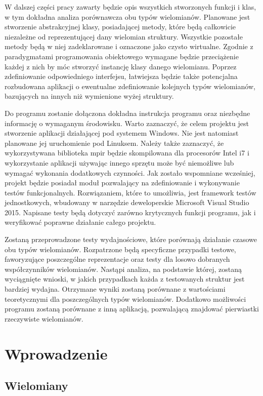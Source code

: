 \documentclass[twoside,a4paper]{book}
\begin{document}
W dalszej części pracy zawarty będzie opis wszystkich stworzonych funkcji i klas, w tym dokładna analiza porównawcza obu typów wielomianów. Planowane jest stworzenie abstrakcyjnej klasy, posiadającej metody, które będą całkowicie niezależne od reprezentującej dany wielomian struktury. Wszystkie pozostałe metody będą w niej zadeklarowane i oznaczone jako czysto wirtualne. Zgodnie z paradygmatami programowania obiektowego wymagane będzie przeciążenie każdej z nich by móc stworzyć instancję klasy danego wielomianu. Poprzez zdefiniowanie odpowiedniego interfejsu, łatwiejsza będzie także potencjalna rozbudowana aplikacji o ewentualne zdefiniowanie kolejnych typów wielomianów, bazujących na innych niż wymienione wyżej struktury.

Do programu zostanie dołączona dokładna instrukcja programu oraz niezbędne informację o wymaganym środowisku. Warto zaznaczyć, że celem projektu jest stworzenie aplikacji działającej pod systemem Windows. Nie jest natomiast planowane jej uruchomienie pod Linuksem. Należy także zaznaczyć, że wykorzystywana biblioteka mpir będzie skompilowana dla procesorów Intel i7 i wykorzystanie aplikacji używając innego sprzętu może być niemożliwe lub wymagać wykonania dodatkowych czynności.
Jak zostało wspomniane wcześniej, projekt będzie posiadał moduł pozwalający na zdefiniowanie i wykonywanie testów funkcjonalnych. Rozwiązaniem, które to umożliwia, jest framework testów jednostkowych, wbudowany w narzędzie deweloperskie Microsoft Visual Studio 2015. Napisane testy będą dotyczyć zarówno krytycznych funkcji programu, jak i weryfikować poprawne działanie całego projektu.

Zostaną przeprowadzone testy wydajnościowe, które porównają działanie czasowe obu typów wielomianów. Rozpatrzone będą specyficzne przypadki testowe, faworyzujące poszczególne reprezentacje oraz testy dla losowo dobranych współczynników wielomianów. Nastąpi analiza, na podstawie której, zostaną wyciągnięte wnioski, w jakich przypadkach każda z testowanych struktur jest bardziej wydajna. Otrzymane wyniki zostaną porównane z wartościami teoretycznymi dla poszczególnych typów wielomianów. Dodatkowo możliwości programu zostaną porównane z inną aplikacją, pozwalającą znajdować pierwiastki rzeczywiste wielomianów.

\chapter{Wprowadzenie}
\section{Wielomiany}
\end{document}
